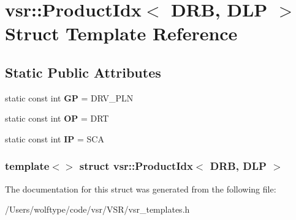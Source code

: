 \hypertarget{structvsr_1_1_product_idx_3_01_d_r_b_00_01_d_l_p_01_4}{\section{vsr\-:\-:Product\-Idx$<$ D\-R\-B, D\-L\-P $>$ Struct Template Reference}
\label{structvsr_1_1_product_idx_3_01_d_r_b_00_01_d_l_p_01_4}
}
\subsection*{Static Public Attributes}
\begin{DoxyCompactItemize}
\item 
\hypertarget{structvsr_1_1_product_idx_3_01_d_r_b_00_01_d_l_p_01_4_a4b36f877bd604b7d8b038209318d788b}{static const int {\bfseries G\-P} = D\-R\-V\-\_\-\-P\-L\-N}\label{structvsr_1_1_product_idx_3_01_d_r_b_00_01_d_l_p_01_4_a4b36f877bd604b7d8b038209318d788b}

\item 
\hypertarget{structvsr_1_1_product_idx_3_01_d_r_b_00_01_d_l_p_01_4_ad06ae58c254cd75d7c1eb20bdff2c148}{static const int {\bfseries O\-P} = D\-R\-T}\label{structvsr_1_1_product_idx_3_01_d_r_b_00_01_d_l_p_01_4_ad06ae58c254cd75d7c1eb20bdff2c148}

\item 
\hypertarget{structvsr_1_1_product_idx_3_01_d_r_b_00_01_d_l_p_01_4_a25008b9485688916c96d5e53b6b73824}{static const int {\bfseries I\-P} = S\-C\-A}\label{structvsr_1_1_product_idx_3_01_d_r_b_00_01_d_l_p_01_4_a25008b9485688916c96d5e53b6b73824}

\end{DoxyCompactItemize}
\subsubsection*{template$<$$>$ struct vsr\-::\-Product\-Idx$<$ D\-R\-B, D\-L\-P $>$}



The documentation for this struct was generated from the following file\-:\begin{DoxyCompactItemize}
\item 
/\-Users/wolftype/code/vsr/\-V\-S\-R/vsr\-\_\-templates.\-h\end{DoxyCompactItemize}

